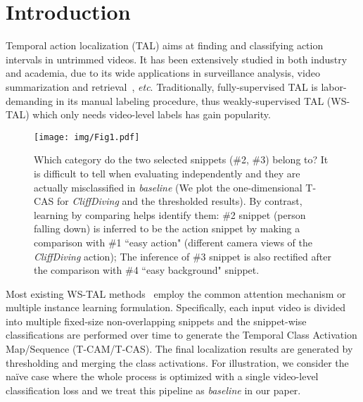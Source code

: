 \documentclass[final]{cvpr}
\begin{document}
\section{Introduction} \label{sec:intro}

Temporal action localization (TAL) aims at finding and classifying action intervals in untrimmed videos. It has been extensively studied in both industry and academia, due to its wide applications in surveillance analysis, video summarization and retrieval~\cite{vishwakarma2013survey,lee2012discovering,ma2005generic}, \emph{etc}. Traditionally, fully-supervised TAL is labor-demanding in its manual labeling procedure, thus weakly-supervised TAL (WS-TAL) which only needs video-level labels has gain popularity. 

\begin{figure}[t]
\begin{center}
\texttt{[image: img/Fig1.pdf]}
\end{center}
 \caption{Which category do the two selected snippets (\#2, \#3) belong to? It is difficult to tell when evaluating independently and they are actually misclassified in \textit{baseline} (We plot the one-dimensional T-CAS for \textit{CliffDiving} and the thresholded results). By contrast, learning by comparing helps identify them: \#2 snippet (person falling down) is inferred to be the action snippet by making a comparison with \#1 ``easy action" (different camera views of the \textit{CliffDiving} action); The inference of \#3 snippet is also rectified after the comparison with \#4 ``easy background" snippet.}
\label{fig:intro}
\end{figure}

Most existing WS-TAL methods~\cite{wang2017untrimmednets,nguyen2018weakly,paul2018w,narayan20193c,lee2020background} employ the common attention mechanism or multiple instance learning formulation. Specifically, each input video is divided into multiple fixed-size non-overlapping snippets and the snippet-wise classifications are performed over time to generate the Temporal Class Activation Map/Sequence (T-CAM/T-CAS)\cite{nguyen2018weakly,shou2018autoloc}. The final localization results are generated by thresholding and merging the class activations. For illustration, we consider the na\"ive case where the whole process is optimized with a single video-level classification loss and we treat this pipeline as \textit{baseline} in our paper.
\end{document}
